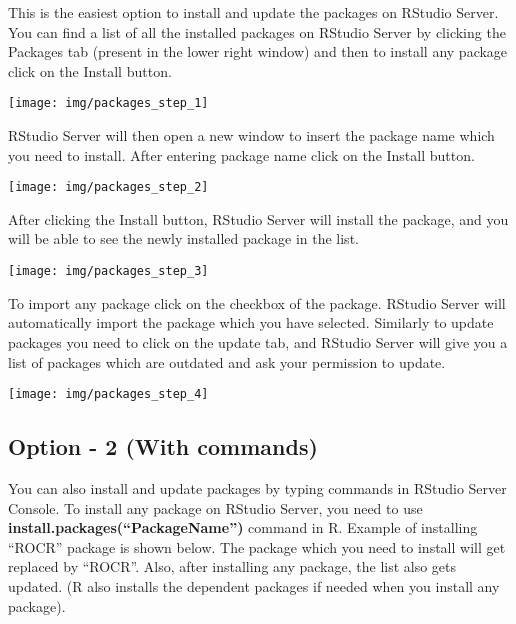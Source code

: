 \documentclass[
]{book}
\begin{document}
This is the easiest option to install and update the packages on RStudio Server. You can find a list of all the installed packages on RStudio Server by clicking the Packages tab (present in the lower right window) and then to install any package click on the Install button.

\begin{center}\texttt{[image: img/packages\_step\_1]} \end{center}

RStudio Server will then open a new window to insert the package name which you need to install. After entering package name click on the Install button.

\begin{center}\texttt{[image: img/packages\_step\_2]} \end{center}

After clicking the Install button, RStudio Server will install the package, and you will be able to see the newly installed package in the list.

\begin{center}\texttt{[image: img/packages\_step\_3]} \end{center}

To import any package click on the checkbox of the package. RStudio Server will automatically import the package which you have selected. Similarly to update packages you need to click on the update tab, and RStudio Server will give you a list of packages which are outdated and ask your permission to update.

\begin{center}\texttt{[image: img/packages\_step\_4]} \end{center}

\hypertarget{option---2-with-commands}{%
\subsection{Option - 2 (With commands)}\label{option---2-with-commands}}

You can also install and update packages by typing commands in RStudio Server Console. To install any package on RStudio Server, you need to use \textbf{install.packages(``PackageName'')} command in R. Example of installing ``ROCR'' package is shown below. The package which you need to install will get replaced by ``ROCR''. Also, after installing any package, the list also gets updated. (R also installs the dependent packages if needed when you install any package).
\end{document}

